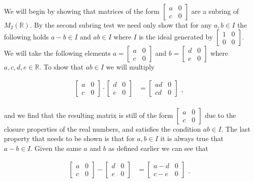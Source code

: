 \documentclass{article}
\begin{document}
      \paragraph{} We will begin by showing that matrices of the form $\begin{bmatrix}a & 0 \\ c & 0 \end{bmatrix}$ are a subring of $M_2(\mathbb{R})$. By the second subring test we need only show that for any $a,b \in I$ the following holds $a-b \in I$ and $ab \in I$ where $I$ is the ideal generated by $\begin{bmatrix}1 & 0 \\ 0 & 0 \end{bmatrix}$. We will take the following elements $a = \begin{bmatrix}a & 0 \\ c & 0 \end{bmatrix}$ and $b = \begin{bmatrix}d & 0 \\ e & 0 \end{bmatrix}$ where $a,c,d,e \in \mathbb{R}$. To show that $ab \in I$ we will multiply

      \[
        \begin{split}
        \begin{bmatrix}a & 0 \\ c & 0 \end{bmatrix} \cdot \begin{bmatrix}d & 0 \\ e & 0 \end{bmatrix} &= \begin{bmatrix}ad & 0 \\ cd & 0 \end{bmatrix}\\
        \end{split},
      \]

      and we find that the resulting matrix is still of the form $\begin{bmatrix}a & 0 \\ c & 0 \end{bmatrix}$ due to the closure properties of the real numbers, and satisfies the condition $ab \in I$. The last property that needs to be shown is that for $a,b \in I$ it is always true that $a-b \in I$. Given the same $a$ and $b$ as defined earlier we can see that
        
        \[
          \begin{split}
          \begin{bmatrix}a & 0 \\ c & 0 \end{bmatrix} - \begin{bmatrix}d & 0 \\ e & 0 \end{bmatrix} &= \begin{bmatrix}a-d & 0 \\ c-e & 0 \end{bmatrix}\\
          \end{split}.
        \]
\end{document}
